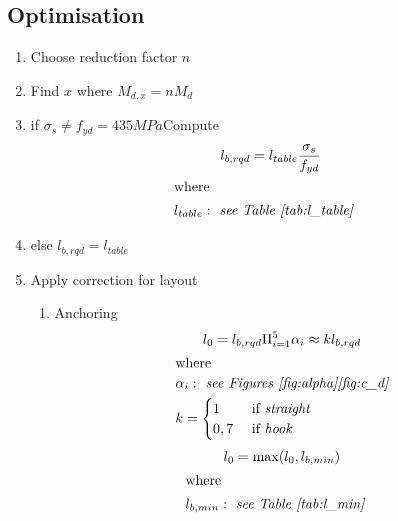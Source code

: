 \documentclass[landscape]{article}
\begin{document}
\begin{multicols*}{2}
\subsection{Optimisation} %
\begin{enumerate}
  \item Choose reduction factor $n$
  \item Find $x$ where $M_{d,x} = nM_d$
  \item if $\sigma_s\neq f_{yd}=435MPa$Compute 
  \begin{gather}\label{eq:2.1}
      l_{b,rqd} = l_{table} \frac{\sigma_s}{f_{yd}} \\
      \shortintertext{where}
      \begin{aligned}
        &l_{table}: \emph{ see Table~\ref{tab:l_table}} 
      \end{aligned}\notag
    \end{gather}
  \item else $l_{b,rqd} = l_{table}$
  \item Apply correction for layout
  \begin{enumerate}
    \item Anchoring
  \begin{gather}\label{eq:2.1}
      l_0 =  l_{b,rqd}\Pi_{i=1}^5 \alpha_i \approx k l_{b,rqd} \\
      \shortintertext{where}
      \begin{aligned}
        &\alpha_i: \emph{ see Figures~\ref{fig:alpha}\ref{fig:c_d}} \\
        & k = 
        \begin{cases}
          1 &\text{ if } \emph{straight}\\
          0,7 &\text{ if } \emph{hook}
        \end{cases}
      \end{aligned}\notag
    \end{gather}
    \begin{gather}\label{eq:2.1}
      l_0 = \max(l_0,l_{b,min}) \\
      \shortintertext{where}
      \begin{aligned}
        &l_{b,min}: \emph{ see Table~\ref{tab:l_min}} 
      \end{aligned}\notag
    \end{gather}


\end{enumerate}
\end{enumerate}
\end{multicols*}
\end{document}

